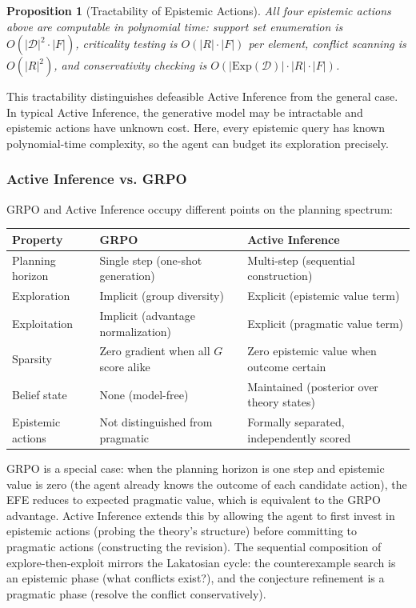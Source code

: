 \documentclass{article}
\newtheorem{proposition}{Proposition}
\newcommand{\D}{\mathcal{D}}
\newcommand{\Exp}{\mathrm{Exp}}
\begin{document}
\begin{proposition}[Tractability of Epistemic Actions]
All four epistemic actions above are computable in polynomial time: support set enumeration is $O(|\D|^2 \cdot |F|)$, criticality testing is $O(|R| \cdot |F|)$ per element, conflict scanning is $O(|R|^2)$, and conservativity checking is $O(|\Exp(\D)| \cdot |R| \cdot |F|)$.
\end{proposition}

This tractability distinguishes defeasible Active Inference from the general case. In typical Active Inference, the generative model may be intractable and epistemic actions have unknown cost. Here, every epistemic query has known polynomial-time complexity, so the agent can budget its exploration precisely.

\subsubsection{Active Inference vs. GRPO}

GRPO and Active Inference occupy different points on the planning spectrum:

\begin{center}
\small
\begin{tabular}{@{}lll@{}}
\toprule
Property & GRPO & Active Inference \\
\midrule
Planning horizon & Single step (one-shot generation) & Multi-step (sequential construction) \\
Exploration & Implicit (group diversity) & Explicit (epistemic value term) \\
Exploitation & Implicit (advantage normalization) & Explicit (pragmatic value term) \\
Sparsity & Zero gradient when all $G$ score alike & Zero epistemic value when outcome certain \\
Belief state & None (model-free) & Maintained (posterior over theory states) \\
Epistemic actions & Not distinguished from pragmatic & Formally separated, independently scored \\
\bottomrule
\end{tabular}
\end{center}

GRPO is a special case: when the planning horizon is one step and epistemic value is zero (the agent already knows the outcome of each candidate action), the EFE reduces to expected pragmatic value, which is equivalent to the GRPO advantage. Active Inference extends this by allowing the agent to first invest in epistemic actions (probing the theory's structure) before committing to pragmatic actions (constructing the revision). The sequential composition of explore-then-exploit mirrors the Lakatosian cycle: the counterexample search is an epistemic phase (what conflicts exist?), and the conjecture refinement is a pragmatic phase (resolve the conflict conservatively).
\end{document}
